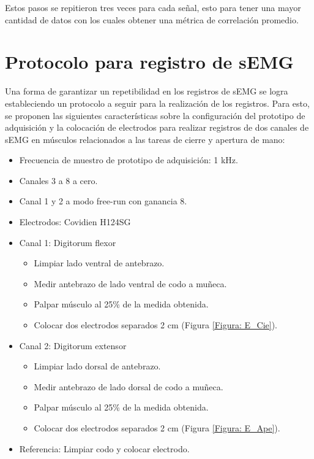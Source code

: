Estos pasos se repitieron tres veces para cada señal, esto para tener una mayor cantidad de datos con los cuales obtener una métrica de correlación promedio.

\section{Protocolo para registro de sEMG}
Una forma de garantizar un repetibilidad en los registros de sEMG se logra estableciendo un protocolo a seguir para la realización de los registros. Para esto, se proponen las siguientes características sobre la configuración del prototipo de adquisición y la colocación de electrodos para realizar registros de dos canales de sEMG en músculos relacionados a las tareas de cierre y apertura de mano:

\begin{itemize}
	\item Frecuencia de muestro de prototipo de adquisición: 1 kHz.
	\item Canales 3 a 8 a cero.
	\item Canal 1 y 2 a modo free-run con ganancia 8.
	\item Electrodos: Covidien H124SG
	\item Canal 1: Digitorum flexor
	\begin{itemize}
		\item Limpiar lado ventral de antebrazo.
		\item Medir antebrazo de lado ventral de codo a muñeca.
		\item Palpar músculo al 25\% de la medida obtenida.
		\item Colocar dos electrodos separados 2 cm (Figura \ref{Figura: E_Cie}).
	\end{itemize}
	\item Canal 2: Digitorum extensor
	\begin{itemize}
		\item Limpiar lado dorsal de antebrazo.
		\item Medir antebrazo de lado dorsal de codo a muñeca.
		\item Palpar músculo al 25\% de la medida obtenida.
		\item Colocar dos electrodos separados 2 cm (Figura \ref{Figura: E_Ape}).
	\end{itemize}
	\item Referencia: Limpiar codo y colocar electrodo.
\end{itemize}

